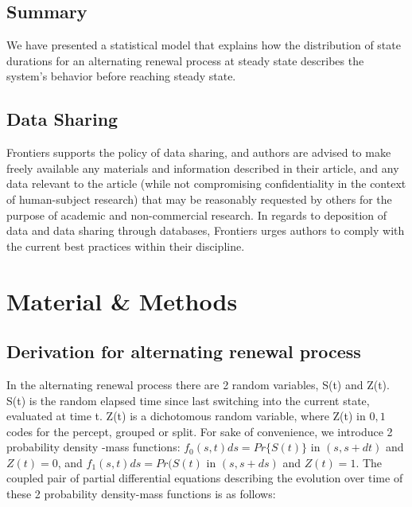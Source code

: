 \documentclass{frontiersSCNS} %
\begin{document}
\subsection{Summary}
We have presented a statistical model that explains how the distribution of state durations for an alternating renewal process at steady state describes the system's behavior before reaching steady state. 

\subsection{Data Sharing}

Frontiers supports the policy of data sharing, and authors are advised to make freely available any materials and information described in their article, and any data relevant to the article (while not compromising confidentiality in the context of human-subject research) that may be reasonably requested by others for the purpose of academic and non-commercial research. In regards to deposition of data and data sharing through databases, Frontiers urges authors to comply with the current best practices within their discipline.

\section{Material \& Methods}

\subsection{Derivation for alternating renewal process}
In the alternating renewal process there are 2 random variables, S(t) and Z(t). S(t) is the random elapsed time since last switching into the current state, evaluated at time t. Z(t) is a dichotomous random variable, where Z(t) in ${0,1}$ codes for the percept, grouped or split. For sake of convenience, we introduce 2 probability density -mass functions: $f_0(s,t) ds = Pr \lbrace S(t) \rbrace$ in $(s,s+dt)$ and $Z(t)=0$, and $f_1(s,t) ds= Pr(S(t)$ in $(s,s+ds)$ and $Z(t)=1$. The coupled pair of partial differential equations describing the evolution over time of these 2 probability density-mass functions is as follows:
\end{document}
